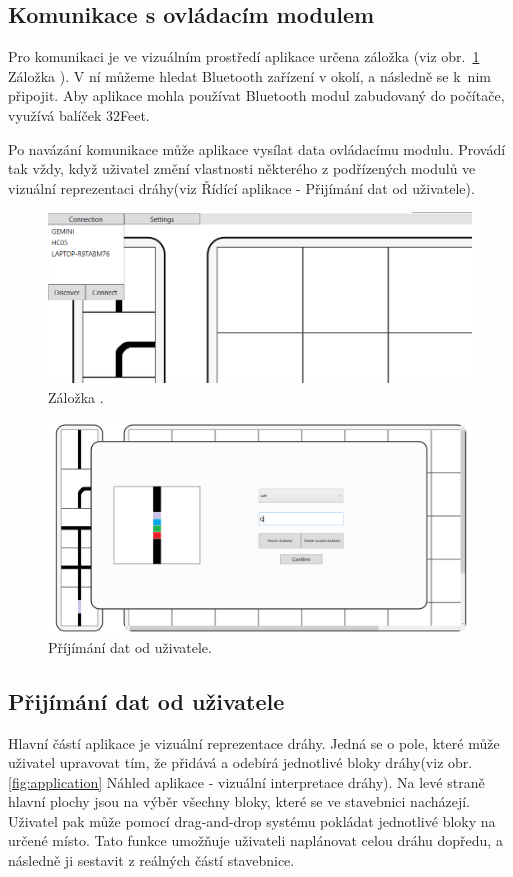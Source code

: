         \subsection{Komunikace s ovládacím modulem}
            Pro komunikaci je ve vizuálním prostředí aplikace určena záložka (viz obr.~\ref{fig:connection} Záložka ). V ní můžeme hledat Bluetooth zařízení v okolí, a následně se k~nim připojit. Aby aplikace mohla používat Bluetooth modul zabudovaný do počítače, využívá balíček 32Feet.

            Po navázání komunikace může aplikace vysílat data ovládacímu modulu. Provádí tak vždy, když uživatel změní vlastnosti některého z podřízených modulů ve vizuální reprezentaci dráhy(viz Řídící aplikace - Přijímání dat od uživatele).

            \begin{figure}[h!]
          \includegraphics[width=\textwidth]{images/pripojeni.png}
          \caption{Záložka .}
          \label{fig:connection}
        \end{figure}
        \begin{figure}[h!]
          \includegraphics[width=\textwidth]{images/userInput.png}
          \caption{Příjímání dat od uživatele.}
          \label{fig:userInput}
        \end{figure}
        \subsection{Přijímání dat od uživatele}
            Hlavní částí aplikace je vizuální reprezentace dráhy. Jedná se o pole, které může uživatel upravovat tím, že přidává a odebírá jednotlivé bloky dráhy(viz obr. \ref{fig:application} Náhled aplikace - vizuální interpretace dráhy). Na levé straně hlavní plochy jsou na výběr všechny bloky, které se ve stavebnici nacházejí. Uživatel pak může pomocí drag-and-drop systému pokládat jednotlivé bloky na určené místo. Tato funkce umožňuje uživateli naplánovat celou dráhu dopředu, a následně ji sestavit z reálných částí stavebnice.

